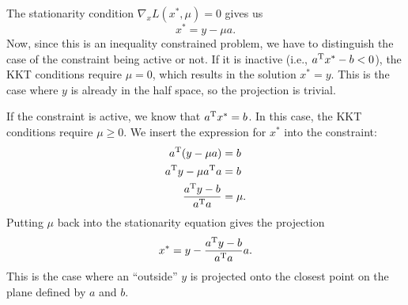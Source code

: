 \documentclass{article}
\begin{document}
The stationarity condition \(\nabla_x L(x^*, \mu) = 0\) gives us
\begin{equation*}
  x^* = y - \mu a.
\end{equation*}
Now, since this is an inequality constrained problem, we have to distinguish the case of the
constraint being active or not.  If it is inactive (i.e., \(a^{\mathrm{T}}x^* - b < 0\)), the KKT conditions
require \(\mu = 0\), which results in the solution \(x^* = y\).  This is the case where \(y\) is
already in the half space, so the projection is trivial.

If the constraint is active, we know that \(a^{\mathrm{T}}x^* = b\).  In this case, the KKT conditions
require \(\mu \geq 0\).  We insert the expression for \(x^*\) into the constraint:
\begin{align*}
  a^{\mathrm{T}}(y - \mu a) &= b \\
  a^{\mathrm{T}} y - \mu a^{\mathrm{T}} a &= b \\
  \frac{a^{\mathrm{T}}y - b}{a^{\mathrm{T}} a} &= \mu.
\end{align*}
Putting \(\mu\) back into the stationarity equation gives the projection
\begin{equation*}
  x^* = y - \frac{a^{\mathrm{T}}y - b}{a^{\mathrm{T}} a} a.
\end{equation*}
This is the case where an ``outside'' \(y\) is projected onto the closest point on the plane defined by \(a\) and
\(b\).




\end{document}
